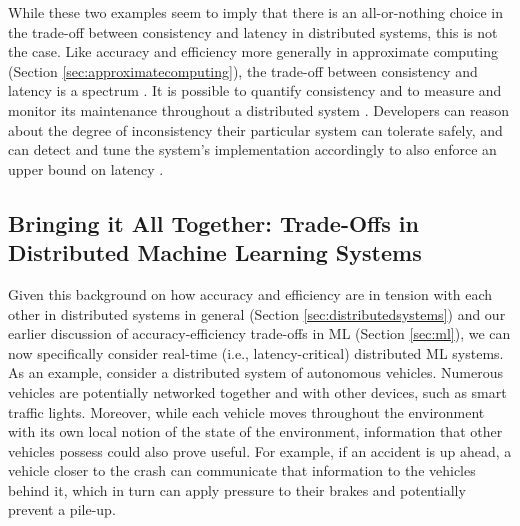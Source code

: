 \documentclass[sigplan,screen]{acmart}
\begin{document}
While these two examples seem to imply that there is an all-or-nothing choice in the trade-off between consistency and latency in distributed systems, this is not the case. Like accuracy and efficiency more generally in approximate computing (Section \ref{sec:approximatecomputing}), the trade-off between consistency and latency is a spectrum \cite{Abadi2012tradeoff, Yu2000conits}. It is possible to quantify consistency and to measure and monitor its maintenance throughout a distributed system  \cite{Lu2015Existential, Shang2018rushmon}. Developers can reason about the degree of inconsistency their particular system can tolerate safely, and can detect and tune the system's implementation accordingly to also enforce an upper bound on latency \cite{Golab2011funandprofit,barbara1990controlledinconsistency, du1989quasi, ramaritham1995eserializability, TorresRojas1999TimedCF, Yu2000numerical}.

\subsection{Bringing it All Together: Trade-Offs in Distributed Machine Learning Systems} \label{sec:distributedml}
Given this background on how accuracy and efficiency are in tension with each other in distributed systems in general (Section \ref{sec:distributedsystems}) and our earlier discussion of accuracy-efficiency trade-offs in ML (Section \ref{sec:ml}), we can now specifically consider real-time (i.e., latency-critical) distributed ML systems. As an example, consider a distributed system of autonomous vehicles. Numerous vehicles are potentially networked together and with other devices, such as smart traffic lights. Moreover, while each vehicle moves throughout the environment with its own local notion of the state of the environment, information that other vehicles possess could also prove useful. For example, if an accident is up ahead, a vehicle closer to the crash can communicate that information to the vehicles behind it, which in turn can apply pressure to their brakes and potentially prevent a pile-up.
\end{document}
